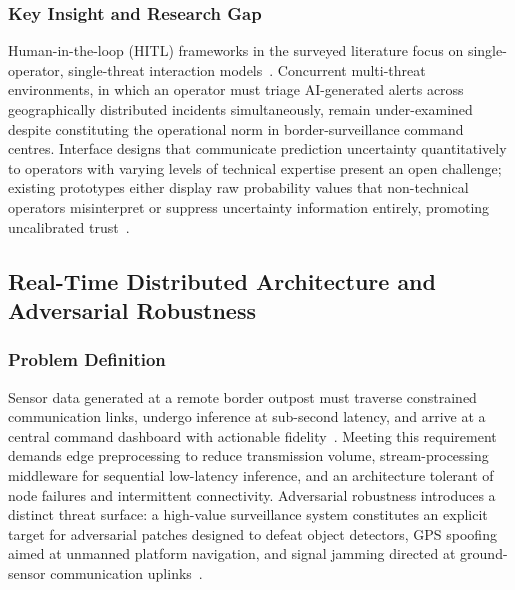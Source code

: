 \subsubsection{Key Insight and Research Gap}
Human-in-the-loop (HITL) frameworks in the surveyed literature focus on single-operator, single-threat interaction models~\cite{hitl2023trust, meaningful2024hitl}. Concurrent multi-threat environments, in which an operator must triage AI-generated alerts across geographically distributed incidents simultaneously, remain under-examined despite constituting the operational norm in border-surveillance command centres. Interface designs that communicate prediction uncertainty quantitatively to operators with varying levels of technical expertise present an open challenge; existing prototypes either display raw probability values that non-technical operators misinterpret or suppress uncertainty information entirely, promoting uncalibrated trust~\cite{hitl2023trust}.


\subsection{Real-Time Distributed Architecture and Adversarial Robustness}
\label{sec:distributed}

\subsubsection{Problem Definition}
Sensor data generated at a remote border outpost must traverse constrained communication links, undergo inference at sub-second latency, and arrive at a central command dashboard with actionable fidelity~\cite{flink2024kafka}. Meeting this requirement demands edge preprocessing to reduce transmission volume, stream-processing middleware for sequential low-latency inference, and an architecture tolerant of node failures and intermittent connectivity. Adversarial robustness introduces a distinct threat surface: a high-value surveillance system constitutes an explicit target for adversarial patches designed to defeat object detectors, GPS spoofing aimed at unmanned platform navigation, and signal jamming directed at ground-sensor communication uplinks~\cite{advyolo2022, milai2025risk}.

